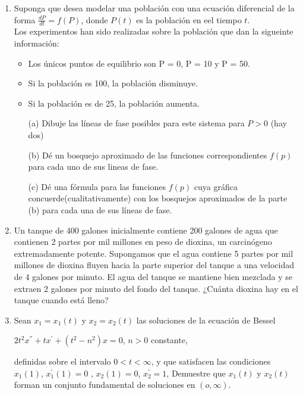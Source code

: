 \documentclass{book}
\begin{document}
    \begin{enumerate}
        \item Suponga que desea modelar una población con 
        una ecuación diferencial de la forma $\frac{dP}{dt}=f(P)$,
        donde $P(t)$ es la población en eel tiempo $t$.\\ 
        Los experimentos han sido realizadas sobre la población 
        que dan la sigueinte información:
        \begin{itemize}
            \item Los únicos puntos de equilibrio son P = 0,
            P = 10 y P = 50. 
            \item Si la población es 100, la población disminuye. 
            \item Si la población es de 25, la población aumenta. 
        \end{itemize}
        \begin{itemize}
            \item[(a)] Dibuje las líneas de fase posibles para este sistema
            para $P>0$ (hay dos)
            \item[(b)] Dé un bosquejo aproximado de las funciones correspondientes
            $f(p)$ para cada uno de sus lineas de fase.
            \item[(c)] Dé una fórmula para las funciones $f(p)$ cuya gráfica 
            concuerde(cualitativamente) con los bosquejos aproximados
            de la parte (b) para cada una de sus líneas de fase.  
        \end{itemize}
        \item Un tanque de 400 galones inicialmente 
        contiene 200 galones de agua que contienen 2 
        partes por mil millones en peso de dioxina, 
        un carcinógeno extremadamente potente. 
        Supongamos que el agua contiene
        5 partes por mil millones de dioxina fluyen 
        hacia la parte superior del tanque a una 
        velocidad de 4 galones por minuto. 
        El agua del tanque se mantiene bien 
        mezclada y se extraen 2 galones por minuto del 
        fondo del tanque. ¿Cuánta dioxina hay en el 
        tanque cuando está lleno?
        \item Sean $x_{1}=x_{1}(t)$ y $x_{2}=x_{2}(t)$ 
        las soluciones de la ecuación de Bessel
        \begin{center}
            $2t^{2}x^{''}+tx^{'}+(t^{2}-n^{2})x=0$, $n>0$ constante,
        \end{center}
        definidas sobre el intervalo $0<t<\infty$, y que satisfacen las condiciones 
        $x_{1}(1)$, $x_{1}^{'}(1)=0$ , $x_{2}(1)=0$, $x_{2}^{'}=1$, Demuestre 
        que $x_{1}(t)$ y $x_{2}(t)$ forman un conjunto fundamental de soluciones en 
        $(o, \infty)$.
    \end{enumerate}
\end{document}

